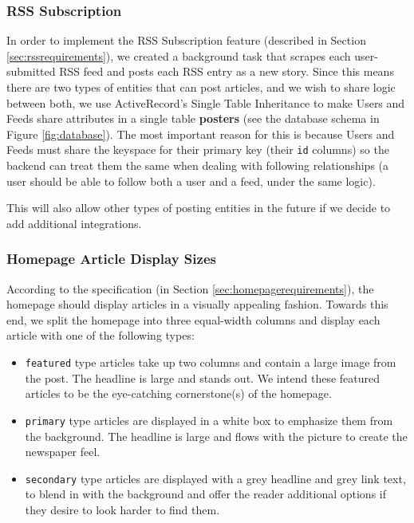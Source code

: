 \documentclass[11pt,letterpaper,titlepage]{article}
\begin{document}
\subsubsection{RSS Subscription}
\label{sec:frontendrss}
In order to implement the RSS Subscription feature (described in Section \ref{sec:rssrequirements}), we created a background task that scrapes each user-submitted RSS feed and posts each RSS entry as a new story.
Since this means there are two types of entities that can post articles, and we wish to share logic between both, we use ActiveRecord's Single Table Inheritance\cite{sti} to make Users and Feeds share attributes in a single table \textbf{posters} (see the database schema in Figure \ref{fig:database}).
The most important reason for this is because Users and Feeds must share the keyspace for their primary key (their \verb+id+ columns) so the backend can treat them the same when dealing with following relationships (a user should be able to follow both a user and a feed, under the same logic).

This will also allow other types of posting entities in the future if we decide to add additional integrations.

\subsubsection{Homepage Article Display Sizes}
According to the specification (in Section \ref{sec:homepagerequirements}), the homepage should display articles in a visually appealing fashion.
Towards this end, we split the homepage into three equal-width columns and display each article with one of the following types:

\begin{itemize}
\item \verb+featured+ type articles take up two columns and contain a large image from the post. The headline is large and stands out. We intend these featured articles to be the eye-catching cornerstone(s) of the homepage.
\item \verb+primary+ type articles are displayed in a white box to emphasize them from the background. The headline is large and flows with the picture to create the newspaper feel.
\item \verb+secondary+ type articles are displayed with a grey headline and grey link text, to blend in with the background and offer the reader additional options if they desire to look harder to find them.
\end{itemize}
\end{document}
